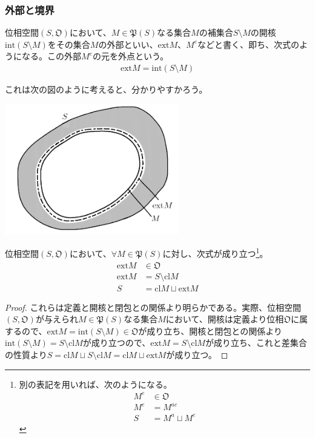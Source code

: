 \documentclass[dvipdfmx]{jsarticle}
\begin{document}
\subsubsection{外部と境界}%
\begin{dfn}
位相空間$\left( S,\mathfrak{O} \right)$において、$M \in \mathfrak{P}(S)$なる集合$M$の補集合$S \setminus M$の開核${\mathrm{int}}(S \setminus M)$をその集合$M$の外部といい、${\mathrm{ext}}M$、$M^{e}$などと書く、即ち、次式のようになる。この外部$M^{e}$の元を外点という。
\begin{align*}
{\mathrm{ext}}M = {\mathrm{int}}(S \setminus M)
\end{align*}
\end{dfn}
これは次の図のように考えると、分かりやすかろう。
\begin{center}
  \includegraphics[width=76mm]{8.1.1.f.png}
\end{center}
\begin{thm}\label{8.1.1.15}
位相空間$\left( S,\mathfrak{O} \right)$において、$\forall M \in \mathfrak{P}(S)$に対し、次式が成り立つ\footnote{別の表記を用いれば、次のようになる。
\begin{align*}
  M^{e}&\in \mathfrak{O}\\
  M^{e} &= M^{ac}\\
  S &= M^{a} \sqcup M^{e}
  \end{align*}}。
\begin{align*}
{\mathrm{ext}}M&\in \mathfrak{O}\\
{\mathrm{ext}}M &= S \setminus {\mathrm{cl}}M\\
S &= {\mathrm{cl}}M \sqcup {\mathrm{ext}}M
\end{align*}
\end{thm}
\begin{proof}
これらは定義と開核と閉包との関係より明らかである。実際、位相空間$\left( S,\mathfrak{O} \right)$が与えられ$M \in \mathfrak{P}(S)$なる集合$M$において、開核は定義より位相$\mathfrak{O}$に属するので、${\mathrm{ext}}M = {\mathrm{int}}(S \setminus M)\in \mathfrak{O}$が成り立ち、開核と閉包との関係より${\mathrm{int}}(S \setminus M) = S \setminus {\mathrm{cl}}M$が成り立つので、${\mathrm{ext}}M = S \setminus {\mathrm{cl}}M$が成り立ち、これと差集合の性質より$S = {\mathrm{cl}}M \sqcup S \setminus {\mathrm{cl}}M = {\mathrm{cl}}M \sqcup {\mathrm{ext}}M$が成り立つ。
\end{proof}
\end{document}
